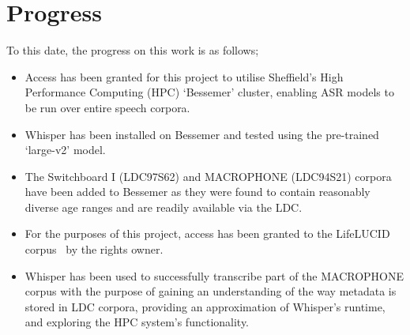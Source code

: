 \chapter{Progress}\label{ch:progress}

To this date, the progress on this work is as follows;

\begin{itemize}
    \item Access has been granted for this project to utilise Sheffield's High Performance
    Computing (HPC) `Bessemer' cluster, enabling ASR models to be run over entire speech corpora.
    \item Whisper\cite{whisper} has been installed on Bessemer and tested using the pre-trained
    `large-v2' model.
    \item The Switchboard I (LDC97S62)\cite{switchboard-ldc} and MACROPHONE
    (LDC94S21)\cite{macrophone} corpora have been added to Bessemer as they were found to
    contain reasonably diverse age ranges and are readily available via the LDC\@.
    \item For the purposes of this project, access has been granted to the LifeLUCID
    corpus~\cite{lifelucid} by the rights owner.
    \item Whisper has been used to successfully transcribe part of the MACROPHONE corpus with the
    purpose of gaining an understanding of the way metadata is stored in LDC corpora, providing an
    approximation of Whisper's runtime, and exploring the HPC system's functionality.
\end{itemize}

